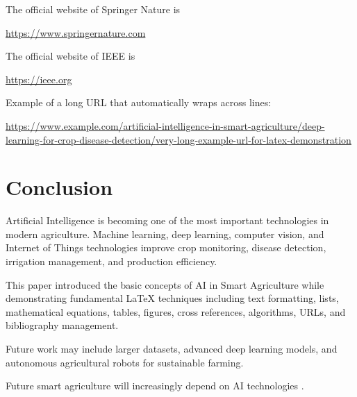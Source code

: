 \documentclass[pdflatex,sn-mathphys-num]{sn-jnl}%
\theoremstyle{thmstyleone}%
\theoremstyle{thmstyletwo}%
\theoremstyle{thmstylethree}%
\begin{document}
The official website of Springer Nature is

\url{https://www.springernature.com}

The official website of IEEE is

\url{https://ieee.org}

Example of a long URL that automatically wraps across lines:

\url{https://www.example.com/artificial-intelligence-in-smart-agriculture/deep-learning-for-crop-disease-detection/very-long-example-url-for-latex-demonstration}

\section{Conclusion}

Artificial Intelligence is becoming one of the most important technologies in modern agriculture. Machine learning, deep learning, computer vision, and Internet of Things technologies improve crop monitoring, disease detection, irrigation management, and production efficiency.

This paper introduced the basic concepts of AI in Smart Agriculture while demonstrating fundamental LaTeX techniques including text formatting, lists, mathematical equations, tables, figures, cross references, algorithms, URLs, and bibliography management.

Future work may include larger datasets, advanced deep learning models, and autonomous agricultural robots for sustainable farming.

Future smart agriculture will increasingly depend on AI technologies
\cite{journal10,conf10,book10}.







\end{document}
